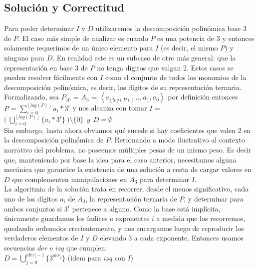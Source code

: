 \subsection{Solución y Correctitud}
	Para poder determinar $I$ y $D$ utilizaremos la descomposición polinómica base 3 de $P$. El caso más simple de analizar es cuando $P$ es una potencia de 3 y entonces solamente requerimos de un único elemento para $I$ (es decir, el mismo $P$) y ninguno para $D$. En realidad este es un subcaso de otro más general: que la representación en base 3 de $P$ no tenga dígitos que valgan 2. Estos casos se pueden resolver fácilmente con $I$ como el conjunto de todos los monomios de la descomposición polinómica, es decir, los dígitos de su representación ternaria. Formalizando, sea $P_{10}$ = $A_3$ = $\left \langle a_{ \left \lfloor{log(P)}\right \rfloor} \ ... \ a_1, a_0  \right \rangle$ por definición entonces \\

	$P$ = $\sum_{i = 0}^{\left \lfloor{log(P)}\right \rfloor} a_i*3^{i}$ y nos alcanza con tomar $I$ = $\bigl ( \ \bigcup_{i=0}^{\left \lfloor{log(P)}\right \rfloor} \{a_i*3^{i}\} \ \bigr ) \setminus \{0\} \ \ y \ \ D = \emptyset $
	\\

	Sin embargo, hasta ahora obviamos qué sucede si hay coeficientes que valen 2 en la descomposición polinómica de $P$. Retornando a modo ilustrativo al contexto narrativo del problema, no poseemos múltiples pesas de un mismo peso. Es decir que, manteniendo por base la idea para el caso anterior, necesitamos alguna mecánica que garantice la existencia de una solución a costa de cargar valores en $D$ que complementen manipulaciones en $A_3$ para determinar $I$.
	\\

	La algoritmia de la solución trata en recorrer, desde el menos significativo, cada uno de los dígitos $a_i$ de $A_3$, la representación ternaria de $P$, y determinar para ambos conjuntos si $3^{i}$ pertenece a alguno. Como la base está implícita, únicamente guardamos los índices o exponentes $i$ a medida que los recorremos, quedando ordenados crecientemente, y nos encargamos luego de reproducir los verdaderos elementos de $I$ y $D$ elevando 3 a cada exponente. Entonces usamos secuencias $der$ e $izq$ que cumplen:
	\\

	$D = \bigcup_{j=0}^{|der|-1} \{3^{der_{j}}\}  $   \quad (ídem para $izq$ con $I$)
	\\

